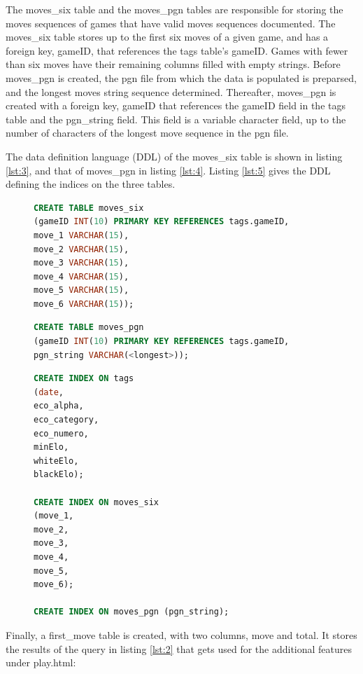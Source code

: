 \documentclass{article}
\begin{document}
The moves\_six table and the moves\_pgn tables are responsible for storing
the moves sequences of games that have valid moves sequences documented.
The moves\_six table stores up to the first six moves of a given game, and
has a foreign key, gameID, that references the tags table's gameID.  Games
with fewer than six moves have their remaining columns filled with empty
strings. Before moves\_pgn is created, the pgn file from which the data
is populated is preparsed, and the longest moves string sequence determined.
Thereafter, moves\_pgn is created with a foreign key, gameID that
references the gameID field in the tags table and the pgn\_string field.
This field is a variable character field, up to the number of characters of
the longest move sequence in the pgn file.

The data definition language (DDL) of the moves\_six table is shown in listing
\ref{lst:3}, and that of moves\_pgn in listing \ref{lst:4}. Listing
\ref{lst:5} gives the DDL defining the indices on the three tables.

\begin{figure}[h]
	\begin{lstlisting}[label={lst:3}, language=sql, frame=single,
	caption=DDL describing the structure of the moves\_six table]
CREATE TABLE moves_six
(gameID INT(10) PRIMARY KEY REFERENCES tags.gameID,
move_1 VARCHAR(15),
move_2 VARCHAR(15),
move_3 VARCHAR(15),
move_4 VARCHAR(15),
move_5 VARCHAR(15),
move_6 VARCHAR(15));
	\end{lstlisting}
\end{figure}

\begin{figure}[h]
	\begin{lstlisting}[label={lst:4}, language=sql, frame=single,
	caption=DDL describing the structure of the moves\_pgn table]
CREATE TABLE moves_pgn
(gameID INT(10) PRIMARY KEY REFERENCES tags.gameID,
pgn_string VARCHAR(<longest>));
	\end{lstlisting}
\end{figure}

\begin{figure}[h]
	\begin{lstlisting}[label={lst:5}, language=sql, frame=single,
	caption=DDL describing the structure of the various indices]
CREATE INDEX ON tags
(date,
eco_alpha,
eco_category,
eco_numero,
minElo,
whiteElo,
blackElo);

CREATE INDEX ON moves_six
(move_1,
move_2,
move_3,
move_4,
move_5,
move_6);

CREATE INDEX ON moves_pgn (pgn_string);
	\end{lstlisting}
\end{figure}
Finally, a first\_move table is created, with two columns, move and total.
It stores the results of the query in listing \ref{lst:2} that gets used for the
additional features under play.html:
\end{document}
